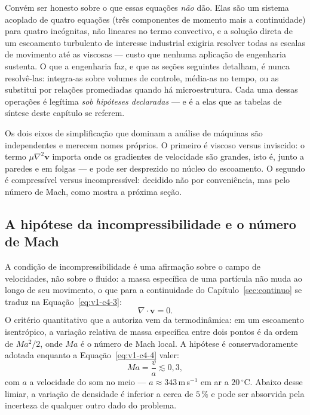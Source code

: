 \documentclass[12pt,a4paper]{article}
\numberwithin{equation}{section}
\numberwithin{table}{section}
\numberwithin{figure}{section}
\begin{document}
Convém ser honesto sobre o que essas equações \emph{não} dão. Elas são um
sistema acoplado de quatro equações (três componentes de momento mais a
continuidade) para quatro incógnitas, não lineares no termo convectivo, e a
solução direta de um escoamento turbulento de interesse industrial exigiria
resolver todas as escalas de movimento até as viscosas --- custo que nenhuma
aplicação de engenharia sustenta. O que a engenharia faz, e que as seções
seguintes detalham, é nunca resolvê-las: integra-as sobre volumes de controle,
média-as no tempo, ou as substitui por relações promediadas quando há
microestrutura. Cada uma dessas operações é legítima \emph{sob hipóteses
declaradas} --- e é a elas que as tabelas de síntese deste capítulo se referem.

Os dois eixos de simplificação que dominam a análise de máquinas são
independentes e merecem nomes próprios. O primeiro é viscoso versus
inviscido: o termo $\mu\nabla^2\mathbf{v}$ importa onde os gradientes de
velocidade são grandes, isto é, junto a paredes e em folgas --- e pode ser
desprezido no núcleo do escoamento. O segundo é compressível versus
incompressível: decidido não por conveniência, mas pelo número de Mach, como
mostra a próxima seção.

\subsection{A hipótese da incompressibilidade e o número de
Mach}\label{sub:v1-c4-incompressivel}

A condição de incompressibilidade é uma afirmação sobre o campo de velocidades,
não sobre o fluido: a massa específica de uma partícula não muda ao longo de
seu movimento, o que para a continuidade do
Capítulo~\ref{sec:continuo} se traduz na Equação~\eqref{eq:v1-c4-3}:
\begin{equation}\label{eq:v1-c4-3}
\nabla\cdot\mathbf{v} = 0 .
\end{equation}
O critério quantitativo que a autoriza vem da termodinâmica: em um escoamento
isentrópico, a variação relativa de massa específica entre dois pontos é da
ordem de $Ma^2/2$, onde $Ma$ é o número de Mach local. A hipótese é
conservadoramente adotada enquanto a Equação~\eqref{eq:v1-c4-4} valer:
\begin{equation}\label{eq:v1-c4-4}
Ma = \frac{v}{a} \lesssim 0{,}3 ,
\end{equation}
com $a$ a velocidade do som no meio --- $a \approx 343\,$m\,s$^{-1}$ em ar a
$20\,^{\circ}$C. Abaixo desse limiar, a variação de densidade é inferior a
cerca de $5\,\%$ e pode ser absorvida pela incerteza de qualquer outro dado do
problema.
\end{document}
